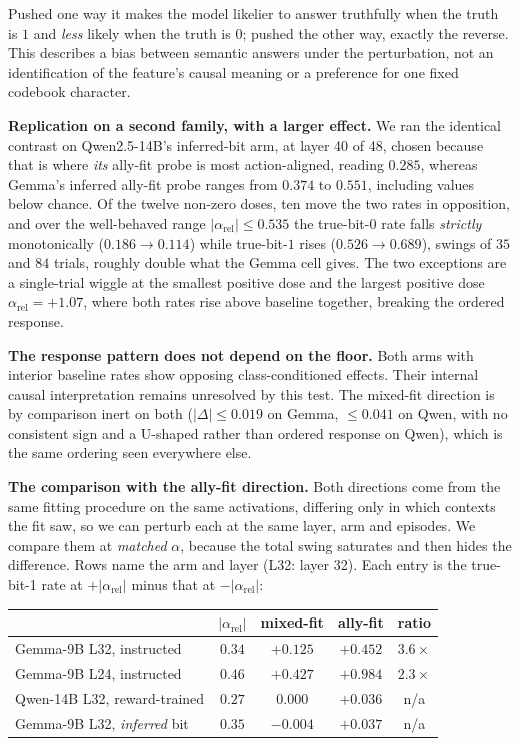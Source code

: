 \documentclass{article}
\begin{document}
Pushed one way it makes the model likelier to answer truthfully when the truth is $1$ and \emph{less} likely
when the truth is $0$; pushed the other way, exactly the reverse. This describes a bias between semantic answers under the perturbation, not an identification of the feature's causal meaning or a preference for one fixed codebook character.

\textbf{Replication on a second family, with a larger effect.} We ran the identical contrast on
Qwen2.5-14B's inferred-bit arm, at layer 40 of 48, chosen because that is where \emph{its} ally-fit probe is most action-aligned, reading $0.285$, whereas Gemma's inferred ally-fit probe ranges from $0.374$ to $0.551$, including values below chance. Of the twelve
non-zero doses, ten move the two rates in opposition, and over the well-behaved range
$|\alpha_{\mathrm{rel}}| \leq 0.535$ the true-bit-$0$ rate falls \emph{strictly} monotonically
($0.186 \to 0.114$) while true-bit-$1$ rises ($0.526 \to 0.689$), swings of $35$ and $84$ trials, roughly
double what the Gemma cell gives. The two exceptions are a single-trial wiggle at the smallest positive dose
and the largest positive dose $\alpha_{\mathrm{rel}} = +1.07$, where both rates rise above baseline together,
breaking the ordered response.

\textbf{The response pattern does not depend on the floor.} Both arms with interior baseline rates show opposing class-conditioned effects. Their internal causal interpretation remains unresolved by this test. The mixed-fit direction
is by comparison inert on both ($|\Delta| \leq 0.019$ on Gemma, $\leq 0.041$ on Qwen, with no consistent sign
and a U-shaped rather than ordered response on Qwen), which is the same ordering seen everywhere else.

\textbf{The comparison with the ally-fit direction.} Both directions come from the same fitting procedure on the same activations, differing only in which
contexts the fit saw, so we can perturb each at the same layer, arm and episodes. We compare them at
\emph{matched} $\alpha$, because the total swing saturates and then hides the difference. Rows name the arm and layer (L32: layer 32). Each entry is the true-bit-1 rate at $+|\alpha_{\mathrm{rel}}|$ minus that at $-|\alpha_{\mathrm{rel}}|$:

\begin{center}
\footnotesize
\begin{tabular}{lcccc}
\toprule
 & $|\alpha_{\mathrm{rel}}|$ & mixed-fit & ally-fit & ratio \\
\midrule
Gemma-9B L32, instructed          & $0.34$ & $+0.125$ & $+0.452$ & $3.6\times$ \\
Gemma-9B L24, instructed          & $0.46$ & $+0.427$ & $+0.984$ & $2.3\times$ \\
Qwen-14B L32, reward-trained      & $0.27$ & $0.000$ & $+0.036$ & n/a \\
Gemma-9B L32, \emph{inferred} bit & $0.35$ & $\mathbf{-0.004}$ & $+0.037$ & n/a \\
\bottomrule
\end{tabular}
\end{center}
\end{document}
